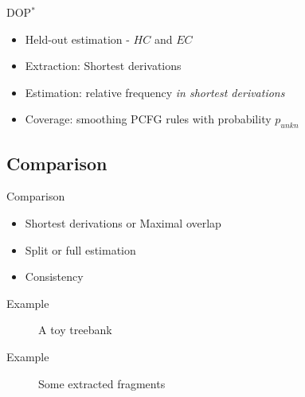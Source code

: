 \documentclass{beamer}
\newcommand{\dops}[0]{DOP$ ^*$}
\begin{document}
\begin{frame}{\dops{}}
\begin{itemize}
\item Held-out estimation - $HC$ and $EC$
\item Extraction: Shortest derivations
\item Estimation: relative frequency \emph{in shortest derivations}
\item Coverage: smoothing PCFG rules with probability $p_{unkn}$
\end{itemize}
\end{frame}

\subsection{Comparison}
\begin{frame}{Comparison}
\begin{itemize}
\item Shortest derivations or Maximal overlap
\item Split or full estimation
\item Consistency
\end{itemize}
\end{frame}

\begin{frame}{Example}
\begin{figure}

\caption{A toy treebank}
\end{figure}
\end{frame}

\begin{frame}{Example}
\begin{figure}

\caption{Some extracted fragments}
\end{figure}
\end{frame}
\end{document}
